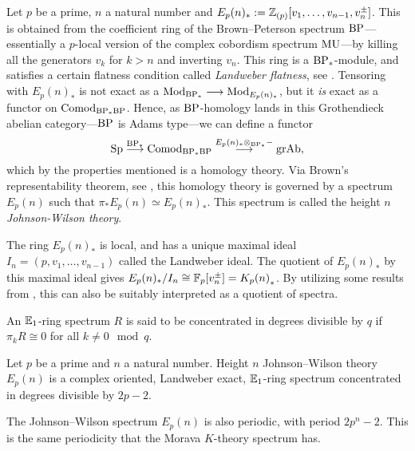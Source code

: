 \begin{construction}
    Let $p$ be a prime, $n$ a natural number and $E_p(n)_* := \mathbb{Z}_{(p)}[v_1, \ldots, v_{n-1}, v_n^{\pm}]$. This is obtained from the coefficient ring of the Brown--Peterson spectrum $\mathrm{BP}$---essentially a $p$-local version of the complex cobordism spectrum $\mathrm{MU}$---by killing all the generators $v_k$ for $k>n$ and inverting $v_n$. This ring is a $\mathrm{BP}_*$-module, and satisfies a certain flatness condition called \emph{Landweber flatness}, see \cite{landweber_76}. Tensoring with $E_p(n)_*$ is not exact as a $\mathrm{Mod}_{\mathrm{BP}_*}\longrightarrow \mathrm{Mod}_{E_p(n)_*}$, but it \emph{is} exact as a functor on $\mathrm{Comod}_{\mathrm{BP}_*\mathrm{BP}}$. Hence, as $\mathrm{BP}$-homology lands in this Grothendieck abelian category---$\mathrm{BP}$ is Adams type---we can define a functor 
    \[\mathrm{Sp} \overset{\mathrm{BP}_*}{\longrightarrow} \mathrm{Comod}_{\mathrm{BP}_*\mathrm{BP}}\overset{E_p(n)_*\otimes_{\mathrm{BP}_*}-}{\longrightarrow} \mathrm{gr}\mathrm{Ab},\]
    which by the properties mentioned is a homology theory. Via Brown's representability theorem, see \cite[Theorem 1]{brown_1962}, this homology theory is governed by a spectrum $E_p(n)$ such that $\pi_* E_p(n) \simeq E_p(n)_*$. This spectrum is called the height $n$ \emph{Johnson-Wilson theory}. 
\end{construction}

\begin{remark}
    \label{ch0:rm:K-as-quotient-of-E}
    The ring $E_p(n)_*$ is local, and has a unique maximal ideal $I_n = (p, v_1, \ldots, v_{n-1})$ called the Landweber ideal. The quotient of $E_p(n)_*$ by this maximal ideal gives $E_p(n)_*/I_n \cong \mathbb{F}_p[v_n^{\pm}] = {K_p(n)}_*$. By utilizing some results from \cite{ekmm_2007}, this can also be suitably interpreted as a quotient of spectra. 
\end{remark}

\begin{definition}
    An $\mathbb{E}_1$-ring spectrum $R$ is said to be concentrated in degrees divisible by $q$ if $\pi_k R \cong 0$ for all $k \not = 0 \mod q$. 
\end{definition}

\begin{proposition}
    \label{ch0:prop:Johnson-Wilson-properties}
    Let $p$ be a prime and $n$ a natural number. Height $n$ Johnson--Wilson theory $E_p(n)$ is a complex oriented, Landweber exact, $\mathbb{E}_1$-ring spectrum concentrated in degrees divisible by $2p-2$. 
\end{proposition}

\begin{remark}
    The Johnson--Wilson spectrum $E_p(n)$ is also periodic, with period $2p^n-2$. This is the same periodicity that the Morava $K$-theory spectrum has. 
\end{remark}

